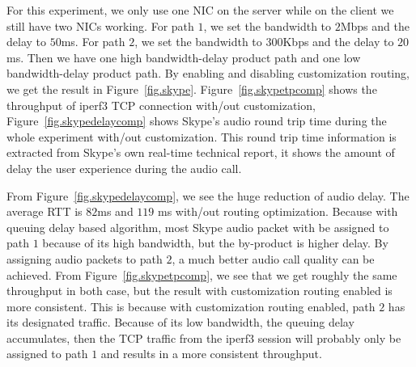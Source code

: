 For this experiment, we only use one NIC on the server while on the client we still have two NICs working. For path $1$, we set the bandwidth to $2$Mbps and the delay to $50$ms. For path $2$, we set the bandwidth to $300$Kbps and the delay to $20$ms. Then we have one high bandwidth-delay product path and one low bandwidth-delay product path. By enabling and disabling customization routing, we get the result in Figure~\ref{fig.skype}. Figure~\ref{fig.skypetpcomp} shows the throughput of iperf3 TCP connection with/out customization, Figure~\ref{fig.skypedelaycomp} shows Skype's audio round trip time during the whole experiment with/out customization. This round trip time information is extracted from Skype's own real-time technical report, it shows the amount of delay the user experience during the audio call. 

From Figure~\ref{fig.skypedelaycomp}, we see the huge reduction of audio delay. The average RTT is $82$ms and $119$ ms with/out routing optimization. Because with queuing delay based algorithm, most Skype audio packet with be assigned to path $1$ because of its high bandwidth, but the by-product is higher delay. By assigning audio packets to path $2$, a much better audio call quality can be achieved. From Figure~\ref{fig.skypetpcomp}, we see that we get roughly the same throughput in both case, but the result with customization routing enabled is more consistent. This is because with customization routing enabled, path $2$ has its designated traffic. Because of its low bandwidth, the queuing delay accumulates, then the TCP traffic from the iperf3 session will probably only be assigned to path $1$ and results in a more consistent throughput.

